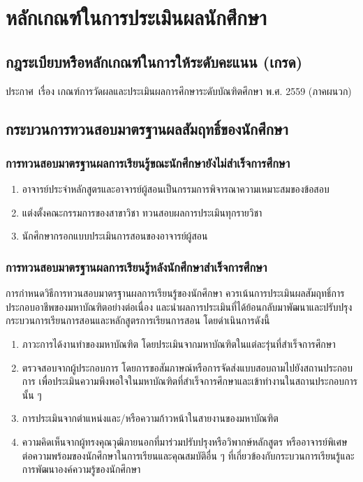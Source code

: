 \chapter{หลักเกณฑ์ในการประเมินผลนักศึกษา}

\section{กฎระเบียบหรืิอหลักเกณฑ์ในการให้ระดับคะแนน (เกรด)}

ประกาศ\university \, เรื่อง เกณฑ์การวัดผลและประเมินผลการศึกษาระดับบัณฑิตศึกษา พ.ศ. 2559 (ภาคผนวก)

\section{กระบวนการทวนสอบมาตรฐานผลสัมฤทธิ์ของนักศึกษา}

\subsection{การทวนสอบมาตรฐานผลการเรียนรู้ขณะนักศึกษายังไม่สำเร็จการศึกษา}
   \begin{enumerate}
   	\item อาจารย์ประจำหลักสูตรและอาจารย์ผู้สอนเป็นกรรมการพิจารณาความเหมาะสมของข้อสอบ 
   	\item แต่งตั้งคณะกรรมการของสาขาวิชา ทวนสอบผลการประเมินทุกรายวิชา
   	\item นักศึกษากรอกแบบประเมินการสอนของอาจารย์ผู้สอน
   	 \end{enumerate}    
  
\subsection{การทวนสอบมาตรฐานผลการเรียนรู้หลังนักศึกษาสำเร็จการศึกษา}
การกำหนดวิธีการทวนสอบมาตรฐานผลการเรียนรู้ของนักศึกษา ควรเน้นการประเมินผลสัมฤทธิ์การประกอบอาชีพของมหาบัณฑิตอย่างต่อเนื่อง และนำผลการประเมินที่ได้ย้อนกลับมาพัฒนาและปรับปรุงกระบวนการเรียนการสอนและหลักสูตรการเรียนการสอน โดยดำเนินการดังนี้
\begin{enumerate}
   	\item ภาวะการได้งานทำของมหาบัณฑิต โดยประเมินจากมหาบัณฑิตในแต่ละรุ่นที่สำเร็จการศึกษา 
   	\item ตรวจสอบจากผู้ประกอบการ โดยการขอสัมภาษณ์หรือการจัดส่งแบบสอบถามไปยังสถานประกอบการ เพื่อประเมินความพึงพอใจในมหาบัณฑิตที่สำเร็จการศึกษาและเข้าทำงานในสถานประกอบการนั้น ๆ
   	\item การประเมินจากตำแหน่งและ/หรือความก้าวหน้าในสายงานของมหาบัณฑิต
   	\item ความคิดเห็นจากผู้ทรงคุณวุฒิภายนอกที่มาร่วมปรับปรุงหรือวิพากษ์หลักสูตร หรืออาจารย์พิเศษ ต่อความพร้อมของนักศึกษาในการเรียนและคุณสมบัติอื่น ๆ ที่เกี่ยวข้องกับกระบวนการเรียนรู้และการพัฒนาองค์ความรู้ของนักศึกษา
   	 \end{enumerate}  

